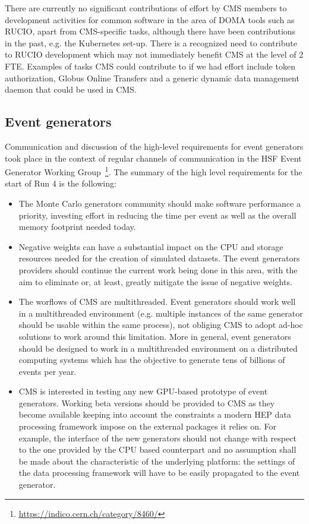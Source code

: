 There are currently no significant contributions of effort by CMS members to development activities for common software in the area of DOMA tools such as RUCIO, apart from CMS-specific tasks, although there have been contributions in the past, e.g. the Kubernetes set-up. There is a recognized need to contribute to RUCIO development which may not immediately benefit CMS at the level of 2 FTE. Examples of tasks CMS could contribute to if we had effort include token authorization, Globus Online Transfers and a generic dynamic data management daemon that could be used in CMS.

\subsection{Event generators}
Communication and discussion of the high-level requirements for event generators took place in the context of regular channels of communication in the HSF Event Generator Working Group~\footnote{\url{https://indico.cern.ch/category/8460/}}.
The summary of the high level requirements for the start of Run 4 is the following:
\begin{itemize}
    \item The Monte Carlo generators community should make software performance a priority, investing effort in reducing the time per event as well as the overall memory footprint needed today.
    \item Negative weights can have a substantial impact on the CPU and storage resources needed for the creation of simulated datasets. The event generators providers should continue the current work being done in this area, with the aim to eliminate or, at least, greatly mitigate the issue of negative weights.
    \item The worflows of CMS are multithreaded. Event generators should work well in a multithreaded environment (e.g. multiple instances of the same generator should be usable within the same process), not obliging CMS to adopt ad-hoc solutions to work around this limitation. More in general, event generators should be designed to work in a multithreaded environment on a distributed computing systems which has the objective to generate tens of billions of events per year.
    \item CMS is interested in testing any new GPU-based prototype of event generators. Working beta versions should be provided to CMS as they become available keeping into account the constraints a modern HEP data processing framework impose on the external packages it relies on. For example, the interface of the new generators should not change with respect to the one provided by the CPU based counterpart and no assumption shall be made about the characteristic of the underlying platform: the settings of the data processing framework will have to be easily propagated to the event generator.
\end{itemize}

